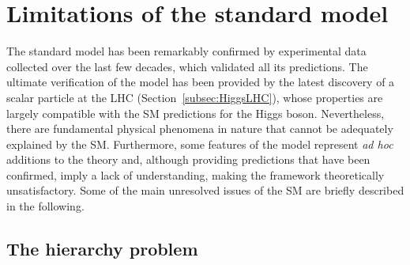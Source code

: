 \section{Limitations of the standard model}
\label{sec:SMLimitations}

The standard model has been remarkably confirmed by experimental data collected over the last few decades, which validated all its predictions.
The ultimate verification of the model has been provided by the latest discovery of a scalar particle at the LHC (Section~\ref{subsec:HiggsLHC}), whose properties are largely compatible with the SM predictions for the Higgs boson.
Nevertheless, there are fundamental physical phenomena in nature that cannot be adequately explained by the SM. %
Furthermore, some features of the model represent \textit{ad hoc} additions to the theory and, although providing predictions that have been confirmed, imply a lack of understanding, making the framework theoretically unsatisfactory.
Some of the main unresolved issues of the SM are briefly described in the following.

\subsection*{The hierarchy problem}

